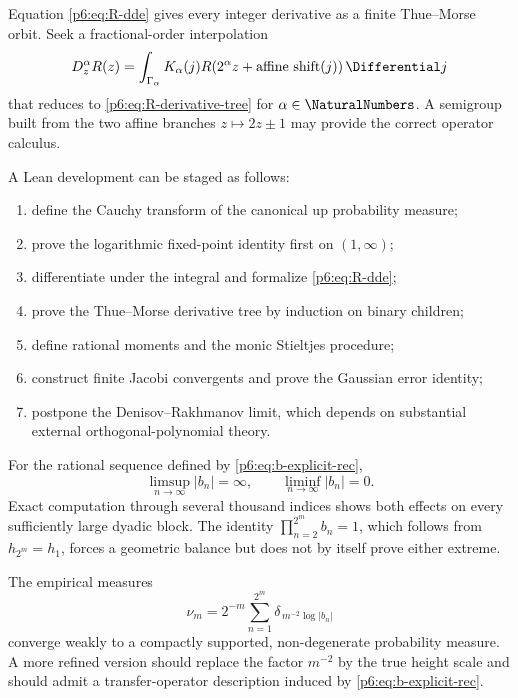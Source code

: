 \documentclass[11pt]{article}
\theoremstyle{definition}
\theoremstyle{remark}
\begin{document}
\begin{openproblem}
Equation \eqref{p6:eq:R-dde} gives every integer derivative as a finite Thue--Morse orbit.
Seek a fractional-order interpolation
\[
 D_z^{\alpha}R(z)=\int_{\Gamma_\alpha}K_\alpha(j)
 R(2^\alpha z+\text{affine shift}(j))\,\Differential j
\]
that reduces to \eqref{p6:eq:R-derivative-tree} for \(\alpha\in\NaturalNumbers\).  A semigroup built from
the two affine branches \(z\mapsto2z\pm1\) may provide the correct operator calculus.
\end{openproblem}

\begin{openproblem}
A Lean development can be staged as follows:
\begin{enumerate}
\item define the Cauchy transform of the canonical up probability measure;
\item prove the logarithmic fixed-point identity first on \((1,\infty)\);
\item differentiate under the integral and formalize \eqref{p6:eq:R-dde};
\item prove the Thue--Morse derivative tree by induction on binary children;
\item define rational moments and the monic Stieltjes procedure;
\item construct finite Jacobi convergents and prove the Gaussian error identity;
\item postpone the Denisov--Rakhmanov limit, which depends on substantial external
      orthogonal-polynomial theory.
\end{enumerate}
\end{openproblem}



\begin{conjecture}
\label{p6:conj:formal-b-unbounded}
For the rational sequence defined by \eqref{p6:eq:b-explicit-rec},
\[
 \limsup_{n\to\infty}|b_n|=\infty,
 \qquad
 \liminf_{n\to\infty}|b_n|=0.
\]
Exact computation through several thousand indices shows both effects on every sufficiently
large dyadic block.  The identity \(\prod_{n=2}^{2^m}b_n=1\), which follows from
\(h_{2^m}=h_1\), forces a geometric balance but does not by itself prove either extreme.
\end{conjecture}

\begin{conjecture}
\label{p6:conj:b-log-limit}
The empirical measures
\[
 \nu_m=2^{-m}\sum_{n=1}^{2^m}
 \delta_{\,m^{-2}\log|b_n|}
\]
converge weakly to a compactly supported, non-degenerate probability measure.  A more
refined version should replace the factor \(m^{-2}\) by the true height scale and should
admit a transfer-operator description induced by \eqref{p6:eq:b-explicit-rec}.
\end{conjecture}
\end{document}
